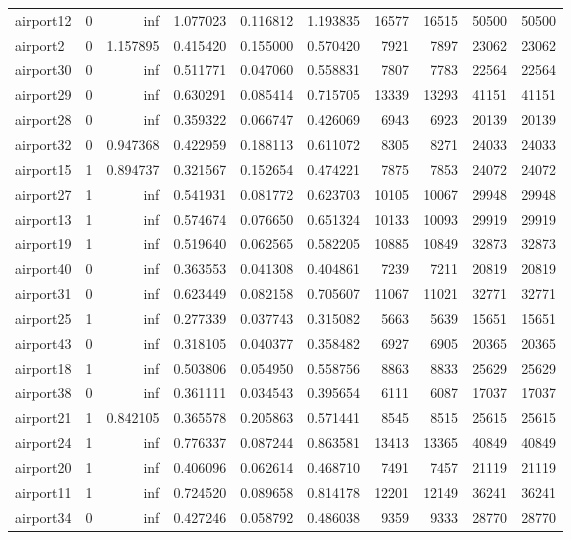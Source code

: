 \begin{longtable}{|l|r|r|r|r|r|r|r|r|r|}
airport12 & 0 & inf & 1.077023 & 0.116812 & 1.193835 & 16577 & 16515 & 50500 & 50500 \\
airport2 & 0 & 1.157895 & 0.415420 & 0.155000 & 0.570420 & 7921 & 7897 & 23062 & 23062 \\
airport30 & 0 & inf & 0.511771 & 0.047060 & 0.558831 & 7807 & 7783 & 22564 & 22564 \\
airport29 & 0 & inf & 0.630291 & 0.085414 & 0.715705 & 13339 & 13293 & 41151 & 41151 \\
airport28 & 0 & inf & 0.359322 & 0.066747 & 0.426069 & 6943 & 6923 & 20139 & 20139 \\
airport32 & 0 & 0.947368 & 0.422959 & 0.188113 & 0.611072 & 8305 & 8271 & 24033 & 24033 \\
airport15 & 1 & 0.894737 & 0.321567 & 0.152654 & 0.474221 & 7875 & 7853 & 24072 & 24072 \\
airport27 & 1 & inf & 0.541931 & 0.081772 & 0.623703 & 10105 & 10067 & 29948 & 29948 \\
airport13 & 1 & inf & 0.574674 & 0.076650 & 0.651324 & 10133 & 10093 & 29919 & 29919 \\
airport19 & 1 & inf & 0.519640 & 0.062565 & 0.582205 & 10885 & 10849 & 32873 & 32873 \\
airport40 & 0 & inf & 0.363553 & 0.041308 & 0.404861 & 7239 & 7211 & 20819 & 20819 \\
airport31 & 0 & inf & 0.623449 & 0.082158 & 0.705607 & 11067 & 11021 & 32771 & 32771 \\
airport25 & 1 & inf & 0.277339 & 0.037743 & 0.315082 & 5663 & 5639 & 15651 & 15651 \\
airport43 & 0 & inf & 0.318105 & 0.040377 & 0.358482 & 6927 & 6905 & 20365 & 20365 \\
airport18 & 1 & inf & 0.503806 & 0.054950 & 0.558756 & 8863 & 8833 & 25629 & 25629 \\
airport38 & 0 & inf & 0.361111 & 0.034543 & 0.395654 & 6111 & 6087 & 17037 & 17037 \\
airport21 & 1 & 0.842105 & 0.365578 & 0.205863 & 0.571441 & 8545 & 8515 & 25615 & 25615 \\
airport24 & 1 & inf & 0.776337 & 0.087244 & 0.863581 & 13413 & 13365 & 40849 & 40849 \\
airport20 & 1 & inf & 0.406096 & 0.062614 & 0.468710 & 7491 & 7457 & 21119 & 21119 \\
airport11 & 1 & inf & 0.724520 & 0.089658 & 0.814178 & 12201 & 12149 & 36241 & 36241 \\
airport34 & 0 & inf & 0.427246 & 0.058792 & 0.486038 & 9359 & 9333 & 28770 & 28770 \\

\end{longtable}
